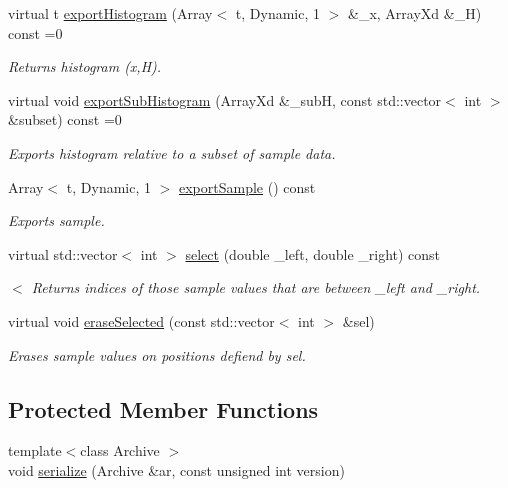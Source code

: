 \begin{DoxyCompactItemize}
virtual t \hyperlink{class_t_sample_a263276b81ccd853821d85915853e5264}{export\-Histogram} (Array$<$ t, Dynamic, 1 $>$ \&\-\_\-x, Array\-Xd \&\-\_\-\-H) const =0
\begin{DoxyCompactList}\small\item\em Returns histogram (x,H). \end{DoxyCompactList}\item 
virtual void \hyperlink{class_t_sample_a1ce3bdd77627f5783edbec6f607c3ea9}{export\-Sub\-Histogram} (Array\-Xd \&\-\_\-sub\-H, const std\-::vector$<$ int $>$ \&subset) const =0
\begin{DoxyCompactList}\small\item\em Exports histogram relative to a subset of sample data. \end{DoxyCompactList}\item 
Array$<$ t, Dynamic, 1 $>$ \hyperlink{class_t_sample_a0316f93893c1c01ed69c0f2784eeaed9}{export\-Sample} () const 
\begin{DoxyCompactList}\small\item\em Exports sample. \end{DoxyCompactList}\item 
virtual std\-::vector$<$ int $>$ \hyperlink{class_t_sample_ad774e7731052f913cba023dcfd619e7d}{select} (double \-\_\-left, double \-\_\-right) const 
\begin{DoxyCompactList}\small\item\em $<$ Returns indices of those sample values that are between \-\_\-left and \-\_\-right. \end{DoxyCompactList}\item 
virtual void \hyperlink{class_t_sample_a97502ddc915cc2f198fbce9ae82622ad}{erase\-Selected} (const std\-::vector$<$ int $>$ \&sel)
\begin{DoxyCompactList}\small\item\em Erases sample values on positions defiend by sel. \end{DoxyCompactList}\end{DoxyCompactItemize}
\subsection*{Protected Member Functions}
\begin{DoxyCompactItemize}
\item 
{\footnotesize template$<$class Archive $>$ }\\void \hyperlink{class_t_sample_a0f53b1db72dd3e83c50ab28dd31929a5}{serialize} (Archive \&ar, const unsigned int version)
\end{DoxyCompactItemize}
